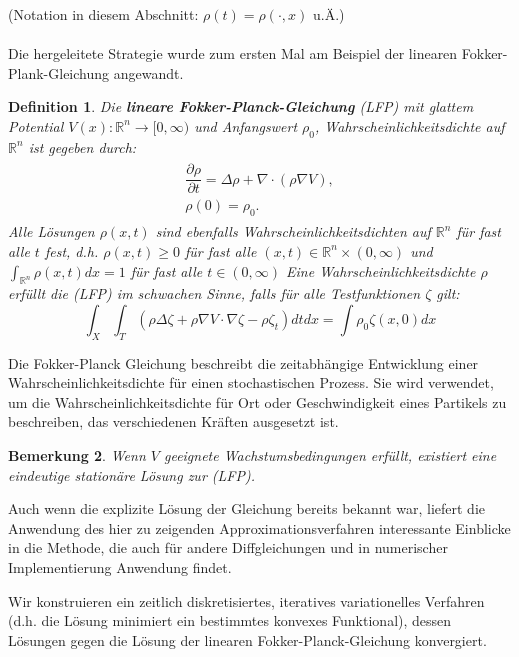 \documentclass[11pt,a4paper,notitlepage]{scrreprt}
\newcommand{\RR}{\mathbb{R}}
\newtheorem{defi}{Definition}[section]
\newtheorem{bem}[defi]{Bemerkung}
\begin{document}
(Notation in diesem Abschnitt: $\rho(t)=\rho(\cdot,x)$ u.Ä.)\\\\
Die hergeleitete Strategie wurde zum ersten Mal am Beispiel der linearen Fokker-Plank-Gleichung angewandt. \\
\begin{defi}
Die \textbf{lineare Fokker-Planck-Gleichung} (LFP) mit glattem Potential $V(x):\RR^n\to[0,\infty)$ und Anfangswert $\rho_0$, Wahrscheinlichkeitsdichte auf $\RR^n$ ist gegeben durch:
\begin{eqnarray}
\begin{split}
\dfrac{\partial\rho}{\partial t}=\Delta\rho+\nabla\cdot(\rho\nabla V),\\
\rho(0)=\rho_0.\label{FP}
\end{split}
\end{eqnarray}
Alle Lösungen $\rho(x,t)$ sind ebenfalls Wahrscheinlichkeitsdichten auf $\RR^n$ für fast alle $t$ fest, d.h. $\rho(x,t)\geq 0$ für fast alle $(x,t)\in \RR^n\times(0,\infty)$  und $\int_{\RR^n}\rho(x,t)dx=1$ für fast alle $t\in(0,\infty)$
Eine Wahrscheinlichkeitsdichte $\rho$ erfüllt die (LFP) im schwachen Sinne, falls für alle Testfunktionen $\zeta$ gilt:
\begin{equation}
\int_X \int_T (\rho\Delta\zeta+\rho\nabla V\cdot\nabla\zeta -\rho\zeta_t) dt dx=\int\rho_0\zeta(x,0)dx \label{FPweak}
\end{equation}
\end{defi}

Die Fokker-Planck Gleichung beschreibt die zeitabhängige Entwicklung einer Wahrscheinlichkeitsdichte für einen stochastischen Prozess. Sie wird verwendet, um die Wahrscheinlichkeitsdichte für Ort oder Geschwindigkeit eines Partikels zu beschreiben, das verschiedenen Kräften ausgesetzt ist.

\begin{bem}
Wenn $V$ geeignete Wachstumsbedingungen erfüllt, existiert eine eindeutige stationäre Lösung zur (LFP).
\end{bem}
Auch wenn die explizite Lösung der Gleichung bereits bekannt war, liefert die Anwendung des hier zu zeigenden Approximationsverfahren interessante Einblicke in die Methode, die auch für andere Diffgleichungen und in numerischer Implementierung Anwendung findet. 


Wir konstruieren ein zeitlich diskretisiertes, iteratives variationelles Verfahren (d.h. die Lösung minimiert ein bestimmtes konvexes Funktional), dessen Lösungen gegen die Lösung der linearen Fokker-Planck-Gleichung konvergiert.
\end{document}
